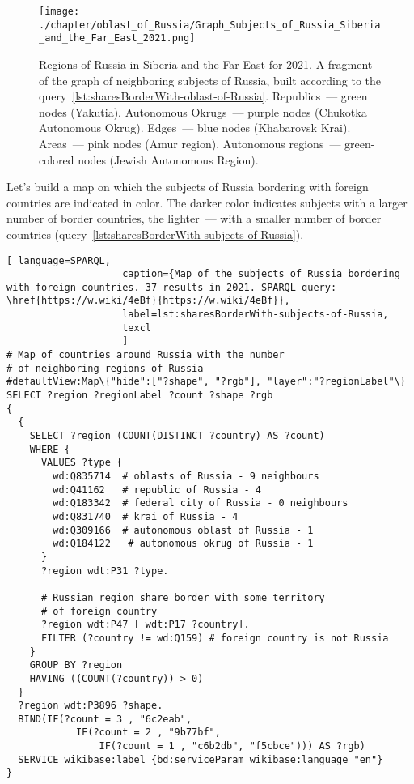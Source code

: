 \begin{figure*}[h]
	\texttt{[image: ./chapter/oblast\_of\_Russia/Graph\_Subjects\_of\_Russia\_Siberia\_and\_the\_Far\_East\_2021.png]}
	\caption[Graph of the subjects of Russia. Kaliningrad, 2021.]{Regions of Russia in Siberia and the Far East for 2021. A fragment of the graph of neighboring subjects of Russia, built according to the query~\protect\ref{lst:sharesBorderWith-oblast-of-Russia}.
	Republics~--- green nodes (Yakutia).
	Autonomous Okrugs~--- purple nodes (Chukotka Autonomous Okrug).
	Edges~--- blue nodes (Khabarovsk Krai).
	Areas~--- pink nodes (Amur region).
	Autonomous regions~--- green-colored nodes (Jewish Autonomous Region).}%
      \label{fig:sharesBorderWith-oblast-of-Russia-Kaliningrad-fig}%
\end{figure*}

\newpage
Let's build a map on which the subjects of Russia bordering with foreign countries are indicated in color. The darker color indicates subjects with a larger number of border countries, the lighter~--- with a smaller number of border countries (query~\protect\ref{lst:sharesBorderWith-subjects-of-Russia}).

\lstset{numbers=left, firstnumber=1, frame=single}
\begin{lstlisting}[ language=SPARQL, 
                    caption={Map of the subjects of Russia bordering with foreign countries. 37 results in 2021. SPARQL query: \href{https://w.wiki/4eBf}{https://w.wiki/4eBf}},
                    label=lst:sharesBorderWith-subjects-of-Russia,
                    texcl 
                    ]
# Map of countries around Russia with the number 
# of neighboring regions of Russia
#defaultView:Map\{"hide":["?shape", "?rgb"], "layer":"?regionLabel"\}
SELECT ?region ?regionLabel ?count ?shape ?rgb
{
  {
    SELECT ?region (COUNT(DISTINCT ?country) AS ?count)
    WHERE {
      VALUES ?type {
        wd:Q835714  # oblasts of Russia - 9 neighbours
        wd:Q41162   # republic of Russia - 4
        wd:Q183342  # federal city of Russia - 0 neighbours
        wd:Q831740  # krai of Russia - 4
        wd:Q309166  # autonomous oblast of Russia - 1
        wd:Q184122   # autonomous okrug of Russia - 1
      }
      ?region wdt:P31 ?type.
  
      # Russian region share border with some territory 
      # of foreign country
      ?region wdt:P47 [ wdt:P17 ?country].
      FILTER (?country != wd:Q159) # foreign country is not Russia
    }
    GROUP BY ?region
    HAVING ((COUNT(?country)) > 0)
  }
  ?region wdt:P3896 ?shape.
  BIND(IF(?count = 3 , "6c2eab", 
            IF(?count = 2 , "9b77bf", 
                IF(?count = 1 , "c6b2db", "f5cbce"))) AS ?rgb)
  SERVICE wikibase:label {bd:serviceParam wikibase:language "en"}  
}
\end{lstlisting}%

